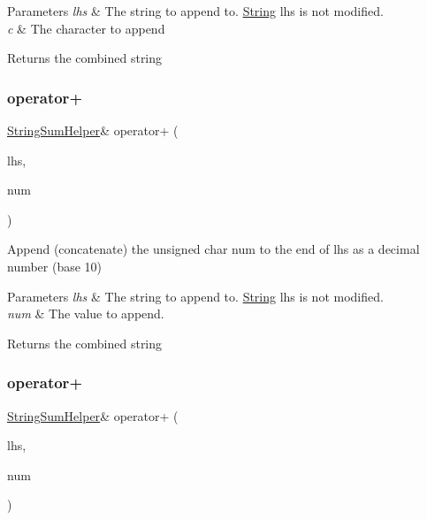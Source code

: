 \begin{DoxyParams}{Parameters}
{\em lhs} & The string to append to. \hyperlink{class_string}{String} lhs is not modified.\\
\hline
{\em c} & The character to append\\
\hline
\end{DoxyParams}
\begin{DoxyReturn}{Returns}
the combined string 
\end{DoxyReturn}
\mbox{\label{class_string_a8b0c50963eaaf2366de418e1fba34cf1}} 
\subsubsection{\texorpdfstring{operator+}{operator+}\hspace{0.1cm}{\footnotesize\ttfamily [4/10]}}
{\footnotesize\ttfamily \hyperlink{class_string_sum_helper}{String\+Sum\+Helper}\& operator+ (\begin{DoxyParamCaption}\item[{const \hyperlink{class_string_sum_helper}{String\+Sum\+Helper} \&}]{lhs,  }\item[{unsigned char}]{num }\end{DoxyParamCaption})\hspace{0.3cm}{\ttfamily [friend]}}



Append (concatenate) the unsigned char num to the end of lhs as a decimal number (base 10) 


\begin{DoxyParams}{Parameters}
{\em lhs} & The string to append to. \hyperlink{class_string}{String} lhs is not modified.\\
\hline
{\em num} & The value to append.\\
\hline
\end{DoxyParams}
\begin{DoxyReturn}{Returns}
the combined string 
\end{DoxyReturn}
\mbox{\label{class_string_a0c7b23137b894e0e6d7607d8386a9285}} 
\subsubsection{\texorpdfstring{operator+}{operator+}\hspace{0.1cm}{\footnotesize\ttfamily [5/10]}}
{\footnotesize\ttfamily \hyperlink{class_string_sum_helper}{String\+Sum\+Helper}\& operator+ (\begin{DoxyParamCaption}\item[{const \hyperlink{class_string_sum_helper}{String\+Sum\+Helper} \&}]{lhs,  }\item[{int}]{num }\end{DoxyParamCaption})\hspace{0.3cm}{\ttfamily [friend]}}



